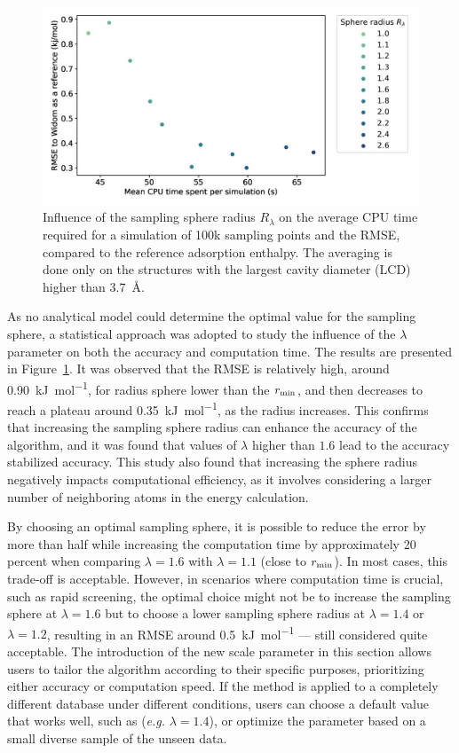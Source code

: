 \documentclass[main]{subfiles}
\begin{document}
\begin{figure}[ht]
\centering
  \includegraphics[width=0.7\linewidth]{figures/3-fastsim/sphere_size_optimisation.jpg}
  \caption{Influence of the sampling sphere radius $R_{\lambda}$ on the average CPU time required for a simulation of 100k sampling points and the RMSE, compared to the reference adsorption enthalpy. The averaging is done only on the structures with the largest cavity diameter (LCD) higher than \SI{3.7}{\angstrom}.}\label{fgr:radius}
\end{figure}

As no analytical model could determine the optimal value for the sampling sphere, a statistical approach was adopted to study the influence of the $\lambda$ parameter on both the accuracy and computation time. The results are presented in Figure~\ref{fgr:radius}. It was observed that the RMSE is relatively high, around \SI{0.90}{\kilo\joule\per\mole}, for radius sphere lower than the $r_{\text{min}}$, and then decreases to reach a plateau around \SI{0.35}{\kilo\joule\per\mole}, as the radius increases. This confirms that increasing the sampling sphere radius can enhance the accuracy of the algorithm, and it was found that values of $\lambda$ higher than $1.6$ lead to the accuracy stabilized accuracy. This study also found that increasing the sphere radius negatively impacts computational efficiency, as it involves considering a larger number of neighboring atoms in the energy calculation.

By choosing an optimal sampling sphere, it is possible to reduce the error by more than half while increasing the computation time by approximately 20 percent when comparing $\lambda=1.6$ with $\lambda=1.1$ (close to $r_{\text{min}}$). In most cases, this trade-off is acceptable. However, in scenarios where computation time is crucial, such as rapid screening, the optimal choice might not be to increase the sampling sphere at $\lambda=1.6$ but to choose a lower sampling sphere radius at $\lambda=1.4$ or $\lambda=1.2$, resulting in an RMSE around \SI{0.5}{\kilo\joule\per\mole} --- still considered quite acceptable. The introduction of the new scale parameter in this section allows users to tailor the algorithm according to their specific purposes, prioritizing either accuracy or computation speed. {If the method is applied to a completely different database under different conditions, users can choose a default value that works well, such as (\emph{e.g.} $\lambda=1.4$), or optimize the parameter based on a small diverse sample of the unseen data.}
\end{document}
